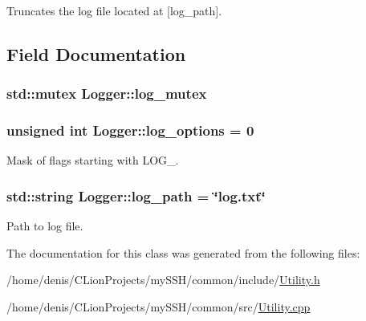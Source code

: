 Truncates the log file located at \mbox{[}log\+\_\+path\mbox{]}. 



\subsection{Field Documentation}
\subsubsection[{\texorpdfstring{log\+\_\+mutex}{log_mutex}}]{\setlength{\rightskip}{0pt plus 5cm}std\+::mutex Logger\+::log\+\_\+mutex}\hypertarget{classLogger_ac92da3167ec7455dfe5599ca74f25be0}{}\label{classLogger_ac92da3167ec7455dfe5599ca74f25be0}
\subsubsection[{\texorpdfstring{log\+\_\+options}{log_options}}]{\setlength{\rightskip}{0pt plus 5cm}unsigned int Logger\+::log\+\_\+options = 0\hspace{0.3cm}{\ttfamily [static]}}\hypertarget{classLogger_ab534ed33da09034d4eb582f363c95517}{}\label{classLogger_ab534ed33da09034d4eb582f363c95517}


Mask of flags starting with L\+O\+G\+\_\+. 

\subsubsection[{\texorpdfstring{log\+\_\+path}{log_path}}]{\setlength{\rightskip}{0pt plus 5cm}std\+::string Logger\+::log\+\_\+path = \char`\"{}log.\+txt\char`\"{}\hspace{0.3cm}{\ttfamily [static]}}\hypertarget{classLogger_ac3b9420ab7de6eb3b54944a891cb4907}{}\label{classLogger_ac3b9420ab7de6eb3b54944a891cb4907}


Path to log file. 



The documentation for this class was generated from the following files\+:\begin{DoxyCompactItemize}
\item 
/home/denis/\+C\+Lion\+Projects/my\+S\+S\+H/common/include/\hyperlink{Utility_8h}{Utility.\+h}\item 
/home/denis/\+C\+Lion\+Projects/my\+S\+S\+H/common/src/\hyperlink{Utility_8cpp}{Utility.\+cpp}\end{DoxyCompactItemize}
